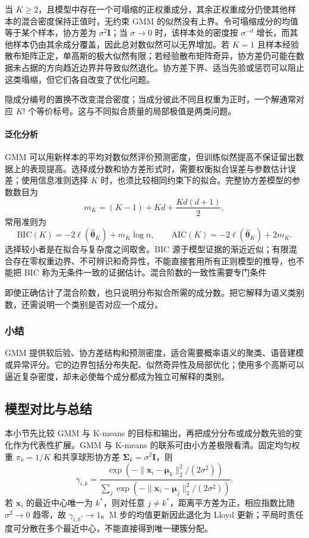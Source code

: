 当 $K\geq2$，且模型中存在一个可塌缩的正权重成分，其余正权重成分仍使其他样本的混合密度保持正值时，无约束 GMM 的似然没有上界。令可塌缩成分的均值等于某个样本，协方差为 $\sigma^2\bm{I}$；当 $\sigma\to0$ 时，该样本处的密度按 $\sigma^{-d}$ 增长，而其他样本仍由其余成分覆盖，因此总对数似然可以无界增加。若 $K=1$ 且样本经验散布矩阵正定，单高斯的极大似然有限；若经验散布矩阵奇异，协方差仍可能在数据未占据的方向趋近边界并导致似然退化。协方差下界、适当先验或惩罚可以阻止这类塌缩，但它们各自改变了优化问题。

隐成分编号的置换不改变混合密度；当成分彼此不同且权重为正时，一个解通常对应 $K!$ 个等价标号。这与不同拟合质量的局部极值是两类问题。

\paragraph{泛化分析}
GMM 可以用新样本的平均对数似然评价预测密度，但训练似然提高不保证留出数据上的表现提高。选择成分数和协方差形式时，需要权衡拟合误差与参数估计误差；使用信息准则选择 $K$ 时，也须比较相同约束下的拟合。完整协方差模型的参数数目为
\[
 m_K=(K-1)+Kd+\frac{Kd(d+1)}{2},
\]
常用准则为
\begin{equation}
 \mathrm{BIC}(K)=-2\ell(\hat{\bm{\theta}}_K)+m_K\log n,
 \qquad
 \mathrm{AIC}(K)=-2\ell(\hat{\bm{\theta}}_K)+2m_K.
 \label{eq:clustering-bic}
\end{equation}
选择较小者是在拟合与复杂度之间取舍。BIC 源于模型证据的渐近近似；有限混合存在零权重边界、不可辨识和奇异性，不能直接套用所有正则模型的推导，也不能把 BIC 称为无条件一致的证据估计。混合阶数的一致性需要专门条件

即使正确估计了混合阶数，也只说明分布拟合所需的成分数。把它解释为语义类别数，还需说明一个类别是否对应一个成分。

\subsubsection{小结}

GMM 提供软后验、协方差结构和预测密度，适合需要概率语义的聚类、语音建模或异常评分。它的边界包括分布失配、似然奇异性及局部优化；使用多个高斯可以逼近复杂密度，却未必使每个成分都成为独立可解释的类别。

\subsection{模型对比与总结}

本小节先比较 GMM 与 K-means 的目标和输出，再把成分分布或成分数先验的变化作为代表性扩展。GMM 与 K-means 的联系可由小方差极限看清。固定均匀权重 $\pi_k=1/K$ 和共享球形协方差 $\bm{\Sigma}_k=\sigma^2\bm{I}$，则
\[
 \gamma_{i,k}=
 \frac{\exp(-\lVert\bm{x}_i-\bm{\mu}_k\rVert_2^2/(2\sigma^2))}
 {\sum_j\exp(-\lVert\bm{x}_i-\bm{\mu}_j\rVert_2^2/(2\sigma^2))}.
\]
若 $\bm{x}_i$ 的最近中心唯一为 $k^\ast$，则对任意 $j\ne k^\ast$，距离平方差为正，相应指数比随 $\sigma^2\to0$ 趋零，故 $\gamma_{i,k^\ast}\to1$。M 步的均值更新因此退化为 Lloyd 更新；平局时责任度可分散在多个最近中心，不能直接得到唯一硬簇分配。

